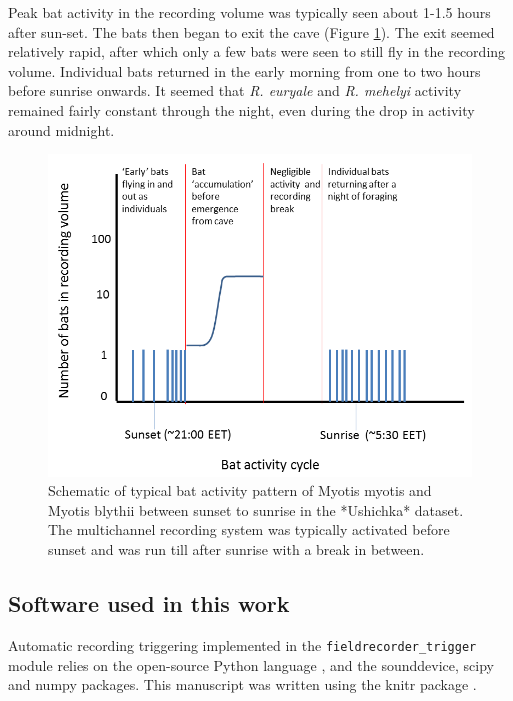 \documentclass[
]{book}
\begin{document}
Peak bat activity in the recording volume was typically seen about 1-1.5 hours after sun-set. The bats then began to exit the cave (Figure \ref{fig:activity}). The exit seemed relatively rapid, after which only a few bats were seen to still fly in the recording volume. Individual bats returned in the early morning from one to two hours before sunrise onwards. It seemed that \emph{R. euryale} and \emph{R. mehelyi} activity remained fairly constant through the night, even during the drop in activity around midnight.

\begin{figure}
\includegraphics[width=1\linewidth]{original_papers/ushichka-figures/ushichka_activity} \caption{Schematic of typical bat activity pattern of Myotis myotis and Myotis blythii between sunset to sunrise in the *Ushichka* dataset. The multichannel recording system was typically activated before sunset and was run till after sunrise with a break in between.}\label{fig:activity}
\end{figure}

\hypertarget{software-used-in-this-work}{%
\subsection{Software used in this work}\label{software-used-in-this-work}}

Automatic recording triggering implemented in the \texttt{fieldrecorder\_trigger} module relies on the open-source Python language \citep{van2011python}, and the sounddevice, scipy and numpy \citep{geier2015a, virtanen2019a, oliphant2006a} packages. This manuscript was written using the knitr package \citep{knitr}.
\end{document}
